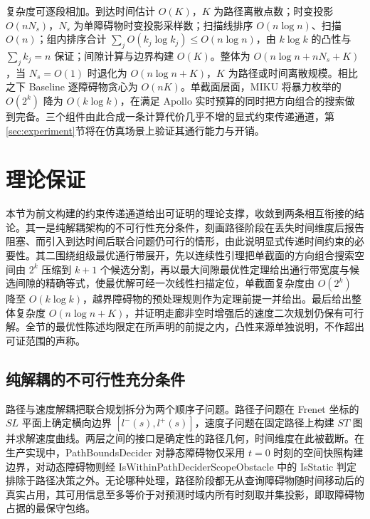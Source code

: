 \documentclass[a4paper,11pt]{ctexart}
\theoremstyle{definition}
\begin{document}
复杂度可逐段相加。到达时间估计 $O(K)$，$K$ 为路径离散点数；时变投影 $O(n N_s)$，$N_s$ 为单障碍物时变投影采样数；扫描线排序 $O(n\log n)$、扫描 $O(n)$；组内排序合计 $\sum_j O(k_j\log k_j)\leq O(n\log n)$，由 $k\log k$ 的凸性与 $\sum_j k_j = n$ 保证；间隙计算与边界构建 $O(K)$。整体为 $O(n\log n + n N_s + K)$，当 $N_s=O(1)$ 时退化为 $O(n\log n + K)$，$K$ 为路径或时间离散规模。相比之下 Baseline 逐障碍物贪心为 $O(nK)$。单截面层面，MIKU 将暴力枚举的 $O(2^k)$ 降为 $O(k\log k)$，在满足 Apollo 实时预算的同时把方向组合的搜索做到完备。三个组件由此合成一条计算代价几乎不增的显式约束传递通道，第\ref{sec:experiment}节将在仿真场景上验证其通行能力与开销。

\makeatletter
{}
\makeatother

\section{理论保证}
\label{sec:theory}

本节为前文构建的约束传递通道给出可证明的理论支撑，收敛到两条相互衔接的结论。其一是纯解耦架构的不可行性充分条件，刻画路径阶段在丢失时间维度后报告阻塞、而引入到达时间后联合问题仍可行的情形，由此说明显式传递时间约束的必要性。其二围绕组级最优通行带展开，先以连续性引理把单截面的方向组合搜索空间由 $2^k$ 压缩到 $k+1$ 个候选分割，再以最大间隙最优性定理给出通行带宽度与候选间隙的精确等式，使最优解可经一次线性扫描定位，单截面复杂度由 $O(2^k)$ 降至 $O(k\log k)$，越界障碍物的预处理规则作为定理前提一并给出。最后给出整体复杂度 $O(n\log n + K)$，并证明走廊非空时增强后的速度二次规划仍保有可行解。全节的最优性陈述均限定在所声明的前提之内，凸性来源单独说明，不作超出可证范围的声称。

\subsection{纯解耦的不可行性充分条件}
\label{sec:thy_infeasible}

路径与速度解耦把联合规划拆分为两个顺序子问题。路径子问题在 Frenet 坐标的 $SL$ 平面上确定横向边界 $[l^{-}(s), l^{+}(s)]$，速度子问题在固定路径上构建 $ST$ 图并求解速度曲线。两层之间的接口是确定性的路径几何，时间维度在此被截断。在生产实现中，PathBoundsDecider 对静态障碍物仅采用 $t{=}0$ 时刻的空间快照构建边界，对动态障碍物则经 IsWithinPathDeciderScopeObstacle 中的 IsStatic 判定排除于路径决策之外。无论哪种处理，路径阶段都无从查询障碍物随时间移动后的真实占用，其可用信息至多等价于对预测时域内所有时刻取并集投影，即取障碍物占据的最保守包络。
\end{document}

